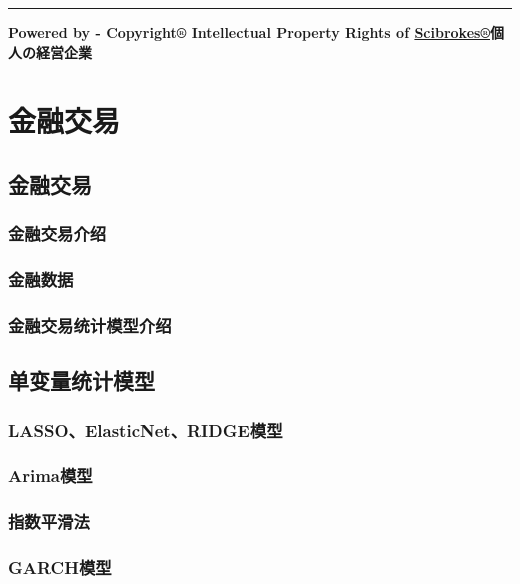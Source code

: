 \documentclass[]{book}
\theoremstyle{definition}
\theoremstyle{definition}
\theoremstyle{definition}
\theoremstyle{remark}
\begin{document}
\begin{center}\rule{0.5\linewidth}{\linethickness}\end{center}

\textbf{Powered by - Copyright® Intellectual Property Rights of
\href{http://www.scibrokes.com}{Scibrokes®}個人の経営企業}

\chapter{金融交易}\label{finance}

\section{金融交易}

\subsection{金融交易介绍}

\subsection{金融数据}

\subsection{金融交易统计模型介绍}

\section{单变量统计模型}

\subsection{LASSO、ElasticNet、RIDGE模型}\label{lassoelasticnetridge}

\subsection{Arima模型}\label{arima}

\subsection{指数平滑法}

\subsection{GARCH模型}\label{garch}
\end{document}
